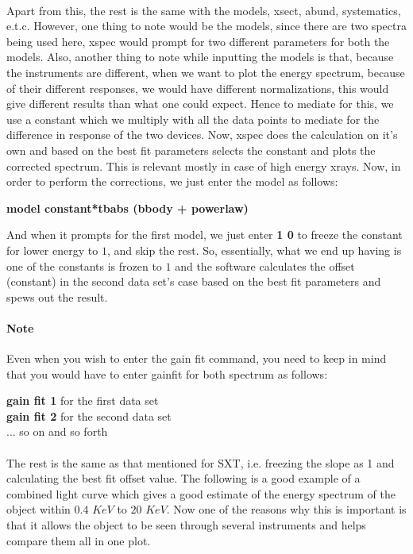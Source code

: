 \documentclass[a4paper,twoside]{report}
\numberwithin{equation}{section}
\begin{document}
\paragraph{}
Apart from this, the rest is the same with the models, xsect, abund, systematics, e.t.c. However, one thing to note would be the models, since there are two spectra being used here, xspec would prompt for two different parameters for both the models. Also, another thing to note while inputting the models is that, because the instruments are different, when we want to plot the energy spectrum, because of their different responses, we would have different normalizations, this would give different results than what one could expect. Hence to mediate for this, we use a constant which we multiply with all the data points to mediate for the difference in response of the two devices. Now, xspec does the calculation on it's own and based on the best fit parameters selects the constant and plots the corrected spectrum. This is relevant mostly in case of high energy xrays. Now, in order to perform the corrections, we just enter the model as follows:
\begin{center}
\textbf{model constant*tbabs (bbody + powerlaw)}
\end{center}
And when it prompts for the first model, we just enter \textbf{1 0} to freeze the constant for lower energy to $1$, and skip the rest. So, essentially, what we end up having is one of the constants is frozen to $1$ and the software calculates the offset (constant) in the second data set's case based on the best fit parameters and spews out the result. 
\paragraph{Note}
Even when you wish to enter the gain fit command, you need to keep in mind that you would have to enter gainfit for both spectrum as follows:
\begin{center}
\textbf{gain fit 1} for the first data set \\
\textbf{gain fit 2} for the second data set \\ 
... so on and so forth
\end{center}
\paragraph{}
The rest is the same as that mentioned for SXT, i.e. freezing the slope as 1 and calculating the best fit offset value. The following is a good example of a combined light curve which gives a good estimate of the energy spectrum of the object within $0.4$ $KeV$ to $20$ $KeV$. Now one of the reasons why this is important is that it allows the object to be seen through several instruments and helps compare them all in one plot. 
\end{document}
